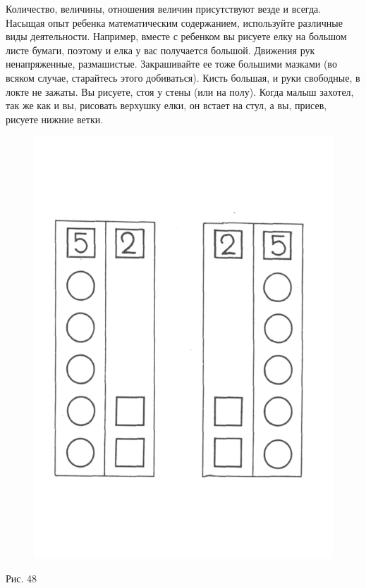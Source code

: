 \documentclass[a5paper]{book}
\begin{document}
Количество, величины, отношения величин присутствуют везде и всегда.
Насыщая опыт ребенка математическим содержанием, используйте различные
виды деятельности. Например, вместе с ребенком вы рисуете елку на
большом листе бумаги, поэтому и елка у вас получается большой. Движения
рук ненапряженные, размашистые. Закрашивайте ее тоже большими мазками
(во всяком случае, старайтесь этого добиваться). Кисть большая, и руки
свободные, в локте не зажаты. Вы рисуете, стоя у стены (или на полу).
Когда малыш захотел, так же как и вы, рисовать верхушку елки, он встает
на стул, а вы, присев, рисуете нижние ветки.

\begin{figure}
\centering
\includegraphics[width=\linewidth]{media/media/image44.png}
\end{figure}

Рис. 48
\end{document}
